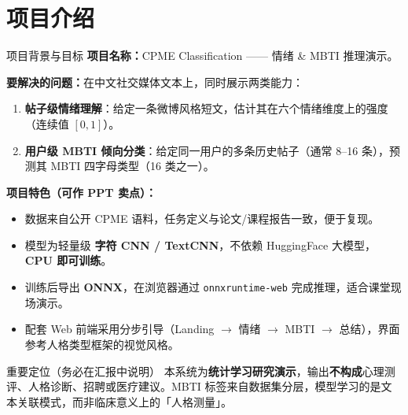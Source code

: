 \section{项目介绍}

\begin{frame}[allowframebreaks]{项目背景与目标}
    \small
    \textbf{项目名称：}CPME Classification —— 情绪 \& MBTI 推理演示。

    \vspace{0.4em}
    \textbf{要解决的问题：}在中文社交媒体文本上，同时展示两类能力：
    \begin{enumerate}
        \item \textbf{帖子级情绪理解}：给定一条微博风格短文，估计其在六个情绪维度上的强度（连续值 $[0,1]$）。
        \item \textbf{用户级 MBTI 倾向分类}：给定同一用户的多条历史帖子（通常 8--16 条），预测其 MBTI 四字母类型（16 类之一）。
    \end{enumerate}

    \vspace{0.4em}
    \textbf{项目特色（可作 PPT 卖点）：}
    \begin{itemize}
        \item 数据来自公开 CPME 语料，任务定义与论文/课程报告一致，便于复现。
        \item 模型为轻量级 \textbf{字符 CNN / TextCNN}，不依赖 HuggingFace 大模型，\textbf{CPU 即可训练}。
        \item 训练后导出 \textbf{ONNX}，在浏览器通过 \texttt{onnxruntime-web} 完成推理，适合课堂现场演示。
        \item 配套 Web 前端采用分步引导（Landing $\to$ 情绪 $\to$ MBTI $\to$ 总结），界面参考人格类型框架的视觉风格。
    \end{itemize}

    \vspace{0.4em}
    \begin{alertblock}{重要定位（务必在汇报中说明）}
        本系统为\textbf{统计学习研究演示}，输出\textbf{不构成}心理测评、人格诊断、招聘或医疗建议。MBTI 标签来自数据集分层，模型学习的是文本关联模式，而非临床意义上的「人格测量」。
    \end{alertblock}
\end{frame}

